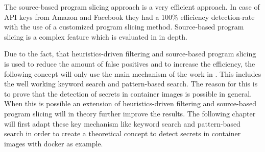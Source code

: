 The source-based program slicing approach is a very efficient approach. In case of API keys from Amazon and Facebook they had a 100\% efficiency detection-rate with the use of a customized program slicing method. Source-based program slicing is a complex feature which is evaluated in \cite{z3} in depth. 

Due to the fact, that heuristics-driven filtering and source-based program slicing is used to reduce the amount of false positives and to increase the efficiency, the following concept will only use the main mechanism of the work in  \cite{7180102}. This includes the well working keyword search and pattern-based search. The reason for this is to prove that the detection of secrets in container images is possible in general. When this is possible an extension of heuristics-driven filtering and source-based program slicing will in theory further improve the results. 
The following chapter will first adapt these key mechanism like keyword search and pattern-based search in order to create a theoretical concept to detect secrets in container images with docker as example.

%
%


